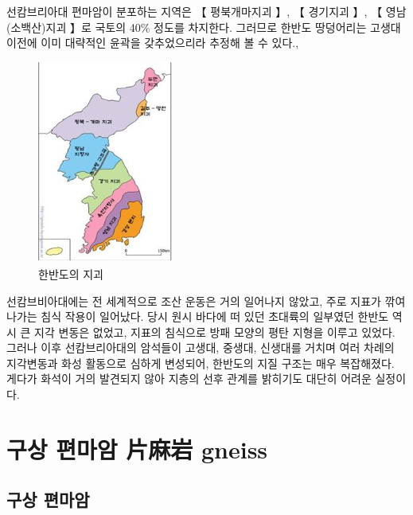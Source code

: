 \documentclass[12pt, a4paper, twoside]{book}
\begin{document}
				선캄브리아대 편마암이 분포하는 지역은 【 평북개마지괴 】, 【 경기지괴 】, 【 영남(소백산)지괴 】로 국토의 40\% 정도를 차지한다. 
				그러므로 한반도 땅덩어리는 고생대 이전에 이미 대략적인 윤곽을 갖추었으리라 추정해 볼 수 있다.,


				\begin{figure}[h]
				\centering
				\caption{한반도의 지괴}
				\includegraphics[width=0.4\textwidth]{./fig/gneiss_1002.jpg}
				\end{figure}

				선캄브비아대에는 전 세계적으로 조산 운동은 거의 일어나지 않았고, 주로 지표가 깎여나가는 침식 작용이 일어났다. 
				당시 원시 바다에 떠 있던 초대륙의 일부였던 한반도 역시 큰 지각 변동은 없었고, 지표의 침식으로 방패 모양의 평탄 지형을 이루고 있었다. 
				그러나 이후 선캄브리아대의 암석들이 고생대, 중생대, 신생대를 거치며 여러 차례의 지각변동과 화성 활동으로 심하게 변성되어, 한반도의 지질 구조는 매우 복잡해졌다. 
				게다가 화석이 거의 발견되지 않아 지층의 선후 관계를 밝히기도 대단히 어려운 실정이다.





	\clearpage
	\section{구상 편마암 片麻岩  gneiss }





		\subsection{구상 편마암}
\end{document}
